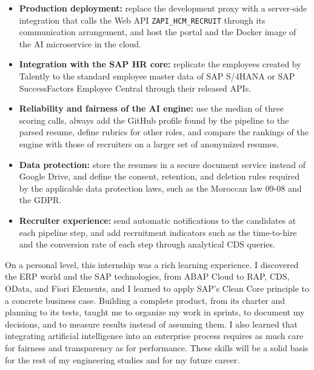 \begin{itemize}
    \item \textbf{Production deployment:} replace the development proxy with a server-side integration that calls the Web API \texttt{ZAPI\_HCM\_RECRUIT} through its communication arrangement, and host the portal and the Docker image of the AI microservice in the cloud.
    \item \textbf{Integration with the SAP HR core:} replicate the employees created by Talently to the standard employee master data of SAP S/4HANA or SAP SuccessFactors Employee Central through their released APIs.
    \item \textbf{Reliability and fairness of the AI engine:} use the median of three scoring calls, always add the GitHub profile found by the pipeline to the parsed resume, define rubrics for other roles, and compare the rankings of the engine with those of recruiters on a larger set of anonymized resumes.
    \item \textbf{Data protection:} store the resumes in a secure document service instead of Google Drive, and define the consent, retention, and deletion rules required by the applicable data protection laws, such as the Moroccan law 09-08 and the GDPR.
    \item \textbf{Recruiter experience:} send automatic notifications to the candidates at each pipeline step, and add recruitment indicators such as the time-to-hire and the conversion rate of each step through analytical CDS queries.
\end{itemize}

On a personal level, this internship was a rich learning experience. I discovered the ERP world and the SAP technologies, from ABAP Cloud to RAP, CDS, OData, and Fiori Elements, and I learned to apply SAP's Clean Core principle to a concrete business case. Building a complete product, from its charter and planning to its tests, taught me to organize my work in sprints, to document my decisions, and to measure results instead of assuming them. I also learned that integrating artificial intelligence into an enterprise process requires as much care for fairness and transparency as for performance. These skills will be a solid basis for the rest of my engineering studies and for my future career.
